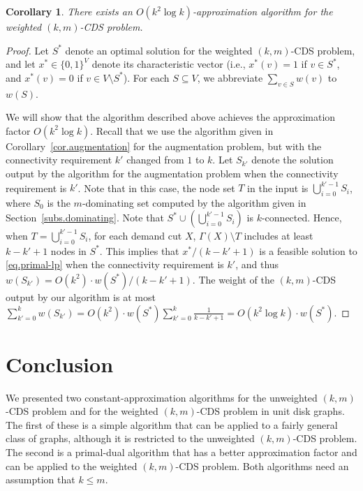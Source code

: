 \documentclass[11pt]{article}
\newtheorem{corollary}{Corollary}
\begin{document}
 \begin{corollary}\label{cor.primal-dual}
  There exists an $O(k^2 \log k)$-approximation algorithm for the
  weighted $(k,m)$-CDS problem.
 \end{corollary}
 \begin{proof}
  Let $S^*$ denote an optimal solution for the weighted $(k,m)$-CDS
  problem, and let $x^* \in \{0,1\}^V$ denote its characteristic vector
  (i.e., $x^*(v)=1$ if $v \in S^*$, and $x^*(v)=0$ if $v \in V \setminus
  S^*$).
  For each $S \subseteq V$, we abbreviate $\sum_{v \in S}w(v)$ to $w(S)$.

 We will show that the algorithm described above achieves the approximation
  factor $O(k^2 \log k)$.
  Recall that we use the algorithm given in
  Corollary~\ref{cor.augmentation} for the augmentation
  problem, but with the connectivity requirement $k'$ changed
  from $1$ to $k$.
  Let $S_{k'}$ denote the solution output by the algorithm for the
  augmentation problem when the connectivity requirement is $k'$.
  Note that in this case, the node set $T$ in the input is $\bigcup_{i=0}^{k'-1}S_{i}$, where $S_0$ is the
  $m$-dominating set computed by the algorithm given in Section~\ref{subs.dominating}.
 Note that $S^* \cup \left(\bigcup_{i=0}^{k'-1}S_{i}\right)$ is $k$-connected.
  Hence, when $T=\bigcup_{i=0}^{k'-1}S_{i}$, for each demand cut $X$,
  $\Gamma(X)\setminus T$ includes at least $k-k'+1$ nodes in $S^*$.
  This implies that $x^*/(k-k'+1)$ is a feasible solution to \eqref{eq.primal-lp}
  when the connectivity requirement is $k'$,
  and thus $w(S_{k'}) = O(k^2) \cdot w(S^*)/ (k-k'+1)$.
  The weight of the $(k,m)$-CDS output by our algorithm
is at most
$\sum_{k'=0}^k w(S_{k'})
   = O(k^2) \cdot w(S^*) \sum_{k'=0}^k \frac{1}{k-k'+1}
   = O(k^2 \log k) \cdot w(S^*).$
\end{proof}

 


 \section{Conclusion}
 \label{sec.conclusion}

 We presented two constant-approximation algorithms for the
 unweighted $(k,m)$-CDS problem
 and for the weighted $(k,m)$-CDS problem in unit
 disk graphs.
 The first of these is a simple algorithm that can be applied to a fairly general class of graphs,
 although it is restricted to the unweighted
 $(k,m)$-CDS problem.
 The second is a primal-dual algorithm that has a better approximation factor and
 can be applied to the weighted $(k,m)$-CDS problem.
 Both algorithms need an assumption that $k \leq m$.
 
\end{document}
